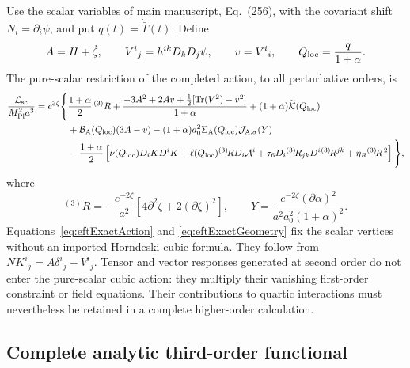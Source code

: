 \documentclass[aps,prd,reprint,onecolumn,notitlepage,nofootinbib,longbibliography,floatfix]{revtex4-2}
\theoremstyle{scstyle}
\theoremstyle{definition}
\theoremstyle{remark}
\newcommand{\mpl}{M_{\rm Pl}}
\newcommand{\cB}{\mathcal B}
\newcommand{\Tr}{\operatorname{Tr}}
\newcommand{\sigA}{\Sigma_{\rm A}}
\newcommand{\Kt}{\widetilde{\mathcal K}}
\newcommand{\cR}{{}^{(3)}\!R}
\newcommand{\cJs}{{\mathcal J_{\rm A,\sigma}}}
\newcommand{\etaR}{\eta_R}
\begin{document}
Use the scalar variables of main manuscript, Eq.~(256), with the covariant shift $N_i=\partial_i\psi$, and put $q(t)=\dot{\bar T}(t)$. Define
\begin{equation}
 A=H+\dot\zeta,\qquad
 V^i{}_j=h^{ik}D_kD_j\psi,\qquad v=V^i{}_i,
 \qquad Q_{\rm loc}=\frac{q}{1+\alpha}.
\label{eq:eftExactVariables}
\end{equation}
The pure-scalar restriction of the completed action, to all perturbative orders, is
\begin{align}
\frac{\mathcal L_{\rm sc}}{\mpl^2a^3}
=e^{3\zeta}\Bigg\{&\frac{1+\alpha}{2}\,{}^{(3)}R
 +\frac{-3A^2+2Av+\tfrac12[\Tr(V^2)-v^2]}{1+\alpha}
 +(1+\alpha)\Kt(Q_{\rm loc})\nonumber\\
 &+\cB_{\rm A}(Q_{\rm loc})(3A-v)
 -(1+\alpha)a_0^2\sigA(Q_{\rm loc})\cJs(Y)\nonumber\\
&-\frac{1+\alpha}{2}\left[\nu(Q_{\rm loc})D_iK D^iK
+\ell(Q_{\rm loc})\cR D_i\mathcal A^i
+\tau_6D_i\cR_{jk}D^i\cR^{jk}+\etaR\cR^{\,2}\right]\Bigg\},
\label{eq:eftExactAction}
\end{align}
where
\begin{equation}
 {}^{(3)}R=-\frac{e^{-2\zeta}}{a^2}
 [4\partial^2\zeta+2(\partial\zeta)^2],\qquad
 Y=\frac{e^{-2\zeta}(\partial\alpha)^2}
 {a^2a_0^2(1+\alpha)^2}.
\label{eq:eftExactGeometry}
\end{equation}
Equations~\eqref{eq:eftExactAction} and \eqref{eq:eftExactGeometry} fix the scalar vertices without an imported Horndeski cubic formula. They follow from
$NK^i{}_j=A\delta^i{}_j-V^i{}_j$. Tensor and vector responses generated at second order do not enter the pure-scalar cubic action: they multiply their vanishing first-order constraint or field equations. Their contributions to quartic interactions must nevertheless be retained in a complete higher-order calculation.

\subsection{Complete analytic third-order functional}
\end{document}
